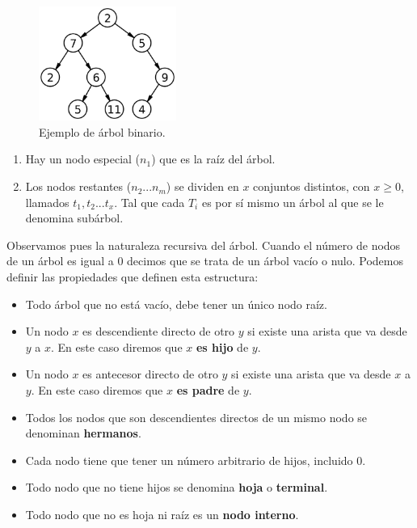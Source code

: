 \documentclass[a4paper, 11pt, titlepage]{article}
\begin{document}
    \begin{figure}[htp]
        \centering
        \includegraphics[width=0.4\textwidth]{resources/arbol01.png}
        \caption{Ejemplo de árbol binario.}
        \label{arbol01}
    \end{figure}

    \begin{enumerate}
        \item Hay un nodo especial ($n_1$) que es la raíz del árbol.
        \item Los nodos restantes ($n_2 ... n_m$) se dividen en $x$ conjuntos distintos, 
        con $x\geq 0$, llamados $t_1, t_2 ... t_x$. Tal que cada $T_i$ es por sí mismo un 
        árbol al que se le denomina subárbol. 
    \end{enumerate}

    Observamos pues la naturaleza recursiva del árbol. Cuando el número de nodos de un árbol
    es igual a 0 decimos que se trata de un árbol vacío o nulo. Podemos definir las propiedades 
    que definen esta estructura:

    \begin{itemize}
        \item Todo árbol que no está vacío, debe tener un único nodo raíz.
        \item Un nodo $x$ es descendiente directo de otro $y$ si existe una arista que va 
        desde $y$ a $x$. En este caso diremos que $x$ \textbf{es hijo} de $y$.
        \item Un nodo $x$ es antecesor directo de otro $y$ si existe una arista que va desde
        $x$ a $y$. En este caso diremos que $x$ \textbf{es padre} de $y$.
        \item Todos los nodos que son descendientes directos de un mismo nodo se denominan 
        \textbf{hermanos}.
        \item Cada nodo tiene que tener un número arbitrario de hijos, incluido 0.
        \item Todo nodo que no tiene hijos se denomina \textbf{hoja} o \textbf{terminal}.
        \item Todo nodo que no es hoja ni raíz es un \textbf{nodo interno}.
    \end{itemize}
\end{document}

